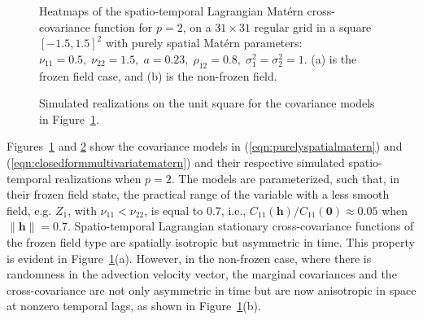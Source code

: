 \documentclass[12pt]{article}
\newcommand{\0}{\mathbf{0}}
\begin{document}
\begin{figure}[!htbp]
 \centering
    \qquad
    \captionsetup[subfloat]{margin=-2cm}
     \caption{Heatmaps of the spatio-temporal Lagrangian Mat\'{e}rn cross-covariance function for $p=2$, on a $31\times 31$ regular grid in a square $[-1.5,1.5]^2$ with purely spatial Mat\'{e}rn parameters: $\nu_{11}=0.5,\;\nu_{22}=1.5,\;a=0.23,\;\rho_{12}=0.8,\;\sigma_1^2=\sigma_2^2=1$. (a) is the frozen field case, and (b) is the non-frozen field.}
   \label{fig:covariance_single_velocity}
   \end{figure}
   
   \begin{figure}[htb!]
 \centering
    \qquad
    \captionsetup[subfloat]{margin=-2cm}
     \caption{Simulated realizations on the unit square for the covariance models in Figure~\ref{fig:covariance_single_velocity}.}
   \label{fig:covariance_single_velocity_realizations}
   \end{figure}
   
Figures~\ref{fig:covariance_single_velocity} and \ref{fig:covariance_single_velocity_realizations} show the covariance models in (\ref{eqn:purelyspatialmatern}) and (\ref{eqn:closedformmultivariatematern}) and their respective simulated spatio-temporal realizations when $p=2$. The models are parameterized, such that, in their frozen field state, the practical range of the variable with a less smooth field, e.g. $Z_1$, with $\nu_{11}<\nu_{22}$, is equal to $0.7$, i.e., $C_{11}(\mathbf{h})/C_{11}(\mathbf{0})\approx 0.05$ when $\|\mathbf{h}\|=0.7$. Spatio-temporal Lagrangian stationary cross-covariance functions of the frozen field type are spatially isotropic but asymmetric in time. This property is evident in Figure~\ref{fig:covariance_single_velocity}(a). However, in the non-frozen case, where there is randomness in the advection velocity vector, the marginal covariances and the cross-covariance are not only asymmetric in time but are now anisotropic in space at nonzero temporal lags, as shown in Figure~\ref{fig:covariance_single_velocity}(b).
\end{document}
